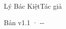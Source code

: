 \begin{titlepage}
\vfill
{\LARGE\sffamily Lý Bác Kiệt\quad Tác giả\par}
\vspace{0.7cm}
{\small\sffamily\color{structurecolor!80} Bản v1.1 · \number\year-\number\month-\number\day\par}
\vspace{1.2cm}
\end{titlepage}
